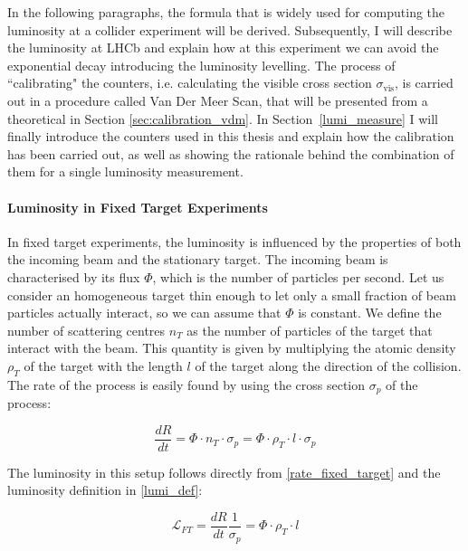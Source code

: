 In the following paragraphs, the formula that is widely used for computing the luminosity at a collider experiment will be derived.
Subsequently, I will describe the luminosity at LHCb and explain how at this experiment we can avoid the exponential decay introducing the luminosity levelling. The process of ``calibrating" the counters, i.e. calculating the visible cross section $\sigma_{\text{vis}}$, is carried out in a procedure called Van Der Meer Scan, that will be presented from a theoretical in Section \ref{sec:calibration_vdm}. In Section~\ref{lumi_measure} I will finally introduce the counters used in this thesis and explain how the calibration has been carried out, as well as showing the rationale behind the combination of them for a single luminosity measurement.

\paragraph{Luminosity in Fixed Target Experiments}
In fixed target experiments, the luminosity is influenced by the properties of both the incoming beam and the stationary target. The incoming beam is characterised by its flux $\Phi$, which is the number of particles per second. Let us consider an homogeneous target thin enough to let only a small fraction of beam particles actually
interact, so we can assume that $\Phi$ is constant. We define the number of scattering centres $n_T$ as the number of particles of the target that interact with the beam. This quantity is given by multiplying the atomic density $\rho_T$ of the target with the length $l$ of the target along the direction of the collision.  
The rate of the process is easily found by using the cross section $\sigma_p$ of the process:

\begin{equation}
\frac{dR}{dt} =\Phi \cdot n_T \cdot \sigma_p = \Phi \cdot \rho_T \cdot l \cdot \sigma_p\label{rate_fixed_target}
\end{equation}

The luminosity in this setup follows directly from \eqref{rate_fixed_target} and the luminosity definition in \eqref{lumi_def}:

\begin{equation}
\mathcal{L}_{FT} = \frac{dR}{dt}\frac{1}{\sigma_p} = \Phi \cdot \rho_T \cdot l
\end{equation}

